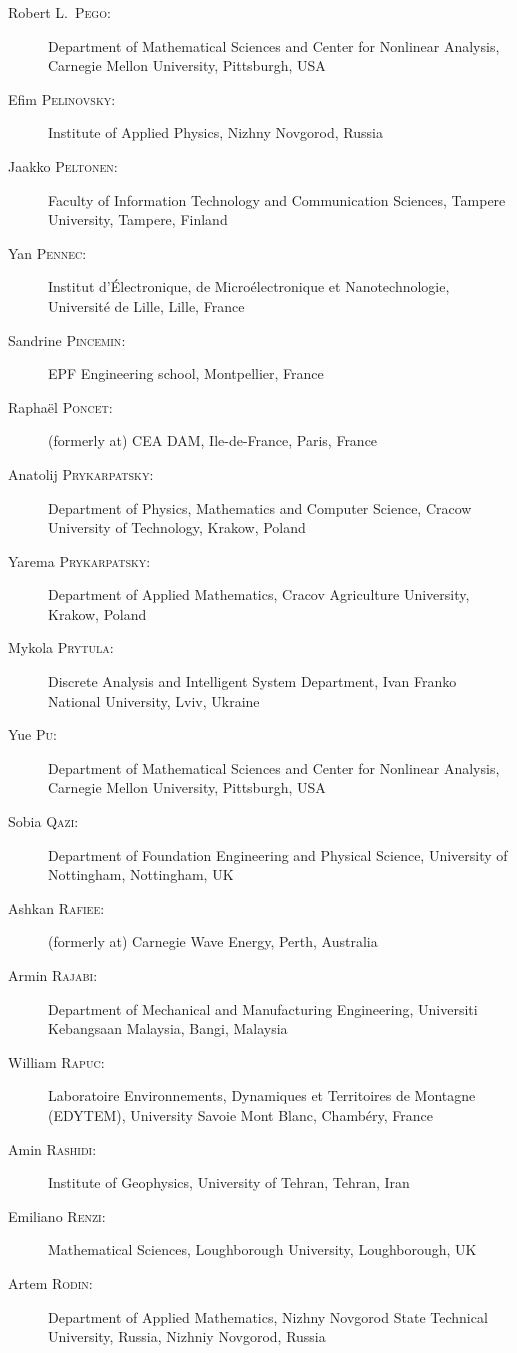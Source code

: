 \begin{description}
  \item[Robert L.~\textsc{Pego}:] Department of Mathematical Sciences and Center for Nonlinear Analysis, Carnegie Mellon University, Pittsburgh, USA
  \item[Efim \textsc{Pelinovsky}:] Institute of Applied Physics, Nizhny Novgorod, Russia
  \item[Jaakko \textsc{Peltonen}:] Faculty of Information Technology and Communication Sciences, Tampere University, Tampere, Finland
  \item[Yan \textsc{Pennec}:] Institut d'\'Electronique, de Micro\'electronique et Nanotechnologie, Universit\'e de Lille, Lille, France
  \item[Sandrine \textsc{Pincemin}:] EPF Engineering school, Montpellier, France
  \item[Rapha\"el \textsc{Poncet}:] (formerly at) CEA DAM, Ile-de-France, Paris, France
  \item[Anatolij \textsc{Prykarpatsky}:] Department of Physics, Mathematics and Computer Science, Cracow University of Technology, Krakow, Poland
  \item[Yarema \textsc{Prykarpatsky}:] Department of Applied Mathematics, Cracov Agriculture University, Krakow, Poland
  \item[Mykola \textsc{Prytula}:] Discrete Analysis and Intelligent System Department, Ivan Franko National University, Lviv, Ukraine
  \item[Yue \textsc{Pu}:] Department of Mathematical Sciences and Center for Nonlinear Analysis, Carnegie Mellon University, Pittsburgh, USA
  \item[Sobia \textsc{Qazi}:] Department of Foundation Engineering and Physical Science, University of Nottingham, Nottingham, UK
  \item[Ashkan \textsc{Rafiee}:] (formerly at) Carnegie Wave Energy, Perth, Australia
  \item[Armin \textsc{Rajabi}:] Department of Mechanical and Manufacturing Engineering, Universiti Kebangsaan Malaysia, Bangi, Malaysia
  \item[William \textsc{Rapuc}:] Laboratoire Environnements, Dynamiques et Territoires de Montagne (EDYTEM), University Savoie Mont Blanc, Chamb\'ery, France
  \item[Amin \textsc{Rashidi}:] Institute of Geophysics, University of Tehran, Tehran, Iran
  \item[Emiliano \textsc{Renzi}:] Mathematical Sciences, Loughborough University, Loughborough, UK
  \item[Artem \textsc{Rodin}:] Department of Applied Mathematics, Nizhny Novgorod State Technical University, Russia, Nizhniy Novgorod, Russia

\end{description}
